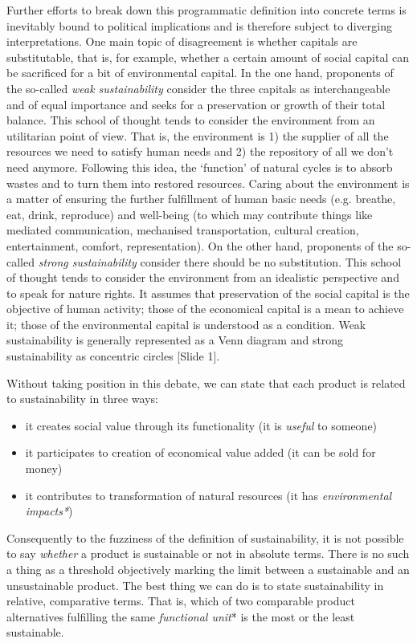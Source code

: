 \documentclass{article}
\begin{document}
Further efforts to break down this programmatic definition into concrete terms is inevitably bound to political implications and is therefore subject to diverging interpretations. One main topic of disagreement is whether capitals are substitutable, that is, for example, whether a certain amount of social capital can be sacrificed for a bit of environmental capital. In the one hand, proponents of the so-called \emph{weak sustainability} consider the three capitals as interchangeable and of equal importance and seeks for a preservation or growth of their total balance. This school of thought tends to consider the environment from an utilitarian point of view. That is, the environment is 1) the supplier of all the resources we need to satisfy human needs and 2) the repository of all we don't need anymore. Following this idea, the `function' of natural cycles is to absorb wastes and to turn them into restored resources. Caring about the environment is a matter of ensuring the further fulfillment of human basic needs (e.g. breathe, eat, drink, reproduce) and well-being (to which may contribute things like mediated communication, mechanised transportation, cultural creation, entertainment, comfort, representation). On the other hand, proponents of the so-called \emph{strong sustainability} consider there should be no substitution. This school of thought tends to consider the environment from an idealistic perspective and to speak for nature rights. It assumes that preservation of the social capital is the objective of human activity; those of the economical capital is a mean to achieve it; those of the environmental capital is understood as a condition. Weak sustainability is generally represented as a Venn diagram and strong sustainability as concentric circles {\color{blue}[Slide 1]}. 

Without taking position in this debate, we can state that each product is related to sustainability in three ways:
\begin{itemize}
	\item it creates social value through its functionality (it is \emph{useful} to someone)
	\item it participates to creation of economical value added (it can be sold for money)
	\item it contributes to transformation of natural resources (it has \emph{environmental impacts*})
\end{itemize}

Consequently to the fuzziness of the definition of sustainability, it is not possible to say \emph{whether} a product is sustainable or not in absolute terms. There is no such a thing as a threshold objectively marking the limit between a sustainable and an unsustainable product. The best thing we can do is to state sustainability in relative, comparative terms. That is, which of two comparable product alternatives fulfilling the same \emph{functional unit}* is the most or the least sustainable. 
\end{document}
